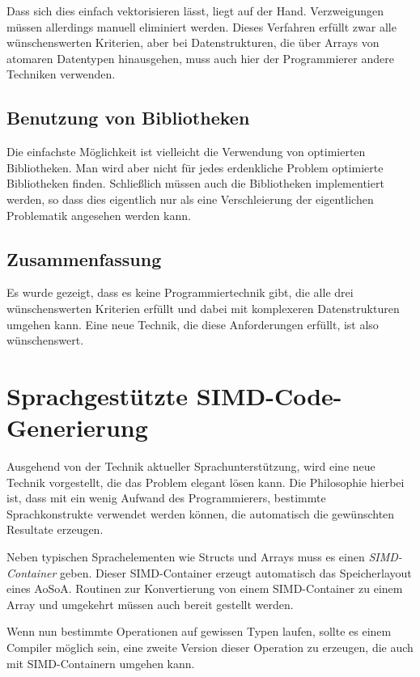 \documentclass[a4paper,10pt]{article}
\begin{document}
Dass sich dies einfach vektorisieren lässt, liegt auf der Hand. Verzweigungen müssen allerdings
manuell eliminiert werden. Dieses Verfahren erfüllt zwar alle wünschenswerten Kriterien, aber bei
Datenstrukturen, die über Arrays von atomaren Datentypen hinausgehen, muss auch hier der
Programmierer andere Techniken verwenden.

\subsection{Benutzung von Bibliotheken}

Die einfachste Möglichkeit ist vielleicht die Verwendung von optimierten Bibliotheken. Man wird aber
nicht für jedes erdenkliche Problem optimierte Bibliotheken finden. Schließlich müssen auch die
Bibliotheken implementiert werden, so dass dies eigentlich nur als eine Verschleierung der
eigentlichen Problematik angesehen werden kann.

\subsection{Zusammenfassung}

Es wurde gezeigt, dass es keine Programmiertechnik gibt, die alle drei wünschenswerten Kriterien
erfüllt und dabei mit komplexeren Datenstrukturen umgehen kann. Eine neue Technik, die diese
Anforderungen erfüllt, ist also wünschenswert.

\newpage
\section{Sprachgestützte SIMD-Code-Generierung}

Ausgehend von der Technik aktueller Sprachunterstützung, wird eine neue Technik vorgestellt, die das Problem
elegant lösen kann. Die Philosophie hierbei ist, dass mit ein wenig Aufwand des Programmierers, bestimmte
Sprachkonstrukte verwendet werden können, die automatisch die gewünschten Resultate erzeugen.

Neben typischen Sprachelementen wie Structs und Arrays muss es einen \emph{SIMD-Container} geben.
Dieser SIMD-Container erzeugt automatisch das Speicherlayout eines AoSoA. Routinen zur
Konvertierung von einem SIMD-Container zu einem Array und umgekehrt müssen auch bereit gestellt
werden.

Wenn nun bestimmte Operationen auf gewissen Typen laufen, sollte es einem Compiler möglich sein,
eine zweite Version dieser Operation zu erzeugen, die auch mit SIMD-Containern umgehen kann.
\end{document}
